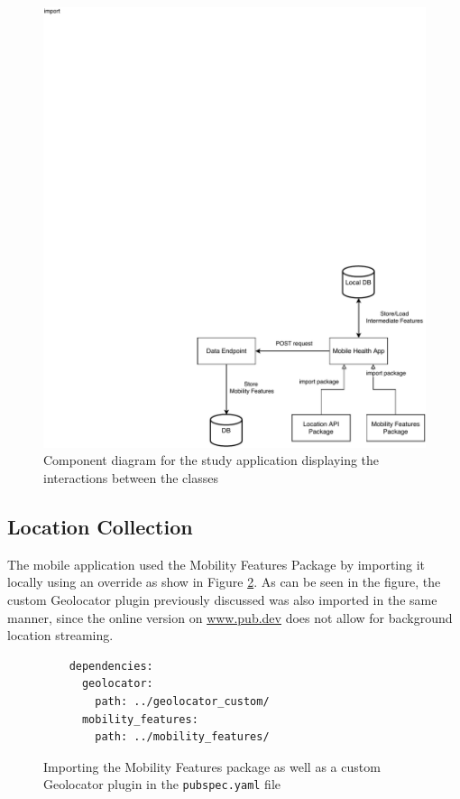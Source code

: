 \begin{figure}
    \centering
    \includegraphics[width=\textwidth]{images/component-diagram.pdf}
    \caption{Component diagram for the study application displaying the interactions between the classes}
    \label{fig:app-component-diagram}
\end{figure}


\subsection{Location Collection}
The mobile application used the Mobility Features Package by importing it locally using an override as show in Figure \ref{fig:import-package}. As can be seen in the figure, the custom Geolocator plugin previously discussed was also imported in the same manner, since the online version on \url{www.pub.dev} does not allow for background location streaming. 

\begin{figure}
    \centering
    \begin{verbatim}
    dependencies:
      geolocator:
        path: ../geolocator_custom/
      mobility_features:
        path: ../mobility_features/
    \end{verbatim}
    \caption{Importing the Mobility Features package as well as a custom Geolocator plugin in the \verb|pubspec.yaml| file}
    \label{fig:import-package}
\end{figure}

